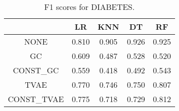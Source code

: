 \begin{table}
\caption{F1 scores for DIABETES.}
\label{tab:f1-DIABETES}
\begin{tabular}{ccccc}
\toprule
 & LR & KNN & DT & RF \\
\midrule
NONE & 0.810 & 0.905 & 0.926 & 0.925 \\
GC & 0.609 & 0.487 & 0.528 & 0.520 \\
CONST\_GC & 0.559 & 0.418 & 0.492 & 0.543 \\
TVAE & 0.770 & 0.746 & 0.750 & 0.807 \\
CONST\_TVAE & 0.775 & 0.718 & 0.729 & 0.812 \\
\bottomrule
\end{tabular}
\end{table}
